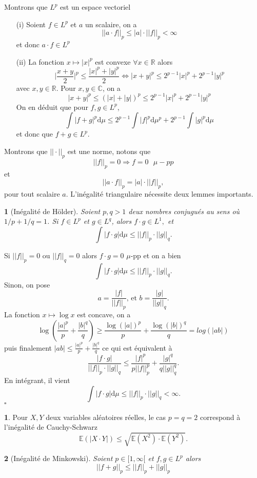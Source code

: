 \documentclass[8pt,notheorems]{beamer}
\def \E{\mathbb E}
\def \R{\mathbb{R}}
\newtheorem{lemma}{\translate{Lemme}}
\theoremstyle{definition}
\theoremstyle{example}
\newtheorem{remark}{\translate{Remarque}}
\theoremstyle{mystyle}
\theoremstyle{plain}
\begin{document}
\begin{frame}[allowframebreaks]
Montrons que $L^p$ est un espace vectoriel
    \begin{itemize}
        \item[(i)] Soient $f\in L^p$ et $a$ un scalaire, on a 
        $$
        ||a\cdot f||_p\leq |a|\cdot ||f||_p<\infty
        $$
        et donc $a\cdot f\in L^p$
        \item[(ii)] La fonction $x\mapsto |x|^p$ est convexe $\forall x \in\R$ alors 
        $$
        \Big\lvert\frac{x+y}{2}\Big\rvert^p\leq\frac{|x|^p+|y|^p}{2}\Leftrightarrow |x+y|^p\leq 2^{p-1}|x|^p+2^{p-1}|y|^p
        $$
        avec $x,y\in \R$. Pour $x,y\in \mathbb{C}$, on a
        $$
        |x+y|^p\leq (|x|+|y|)^p\leq 2^{p-1}|x|^p+2^{p-1}|y|^p
        $$
        On en déduit que pour $f,g\in L^p$,
        $$
        \int|f+g|^p\text{d}\mu\leq 2^{p-1}\int|f|^p\text{d}\mu^p+2^{p-1}\int|g|^p\text{d}\mu
        $$
        et donc que $f+g\in L^p$. 
    \end{itemize} 
Montrons que $||\cdot||_p$ est une norme, notons que 
$$||f||_p = 0 \Rightarrow f = 0 \text{ }\mu-pp$$
et 
$$
||a\cdot f||_p = |a|\cdot||f||_p,
$$
pour tout scalaire $a$. L'inégalité triangulaire nécessite deux lemmes importants.
\begin{lemma}[Inégalité de Hölder]
Soient $p,q>1$ deux nombres conjugués au sens où $1/p+1/q=1$. Si $f\in L^p$ et $g\in L^q$, alors $f\cdot g \in L^1,$ et 
$$
\int |f\cdot g|\text{d}\mu\leq ||f||_p\cdot ||g||_q.
$$
\end{lemma}
Si $||f||_p = 0$ ou $||f||_q = 0$ alors $f\cdot g = 0$ $\mu$-pp et on a bien 
$$
\int |f\cdot g|\text{d}\mu\leq ||f||_p\cdot ||g||_q.
$$
Sinon, on pose 
$$
a = \frac{|f|}{||f||_p}\text{, et }b = \frac{|g|}{||g||_q}.
$$
La fonction $x\mapsto \log x$ est concave, on a 
$$
\log\left(\frac{|a|^p}{p}+\frac{|b|^q}{q}\right)\geq \frac{\log(|a|)^p}{p}+\frac{\log(|b|)^q}{q} = log(|ab|)
$$
puis finalement $|ab|\leq \frac{|a|^p}{p}+\frac{|b|^q}{q}$ ce qui est équivalent à  
$$
\frac{|f\cdot g|}{||f||_p\cdot ||g||_q}\leq \frac{|f|^p}{p||f||_p^p}+\frac{|g|^q}{q||g||_q^q}.
$$
En intégrant, il vient 
$$
\int |f\cdot g|\text{d}\mu\leq ||f||_p\cdot ||g||_q<\infty.
$$
$\square$
\begin{remark}
Pour $X,Y$ deux variables aléatoires réelles, le cas $p = q=2$ correspond à l'inégalité de Cauchy-Schwarz
$$
\E(|X\cdot Y|)\leq \sqrt{\E(X^2)\cdot\E(Y^2)}.
$$
\end{remark}
\begin{lemma}[Inégalité de Minkowski]
Soient $p\in [1,\infty[$ et $f,g\in L^p$ alors 
$$
||f+g||_p\leq ||f||_p + ||g||_p
$$
\end{lemma}
\end{frame}
\end{document}
